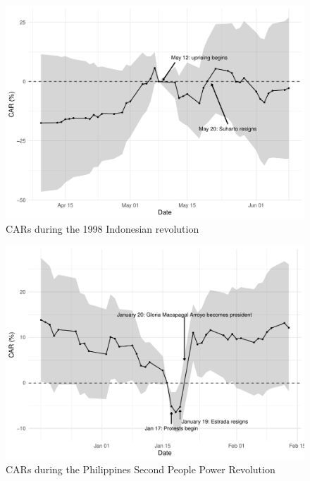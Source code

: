\documentclass[12pt,final,fleqn]{article}
\theoremstyle{plain}
\begin{document}
\begin{figure}[!ht]
\centering
\includegraphics[scale=0.8]{../figs/indonesia-1998.pdf}
\caption{CARs during the 1998 Indonesian revolution}
\label{fig:CAR-Egypt}
\end{figure}

\begin{figure}[!ht]
\centering
\includegraphics[scale=0.8]{../figs/phil-2001.pdf}
\caption{CARs during the Philippines Second People Power Revolution}
\label{fig:CAR-Egypt}
\end{figure}
\end{document}
